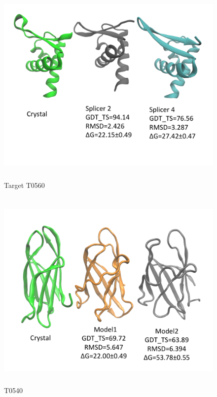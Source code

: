 \documentclass[12pt]{article}
\begin{document}
\begin{figure}
\begin{center}
\includegraphics[width=12cm,height=10cm]{T0560.pdf}
\end{center}
\caption{Target T0560}
\label{fig:T0560}
\end{figure}

\begin{figure}
\begin{center}
\includegraphics[width=12cm,height=10cm]{T0540.pdf}
\end{center}
\caption{T0540}
\label{fig:T0540}
\end{figure}
\end{document}
